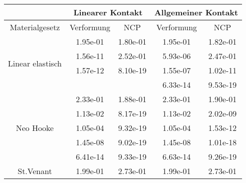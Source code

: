 \begin{table} 
\centering 
\begin{tabular}{c|cc|cc|} 
\cline{2-5} 
 & \multicolumn{2}{|c|}{Linearer Kontakt} & \multicolumn{2}{|c|}{Allgemeiner Kontakt} \\ 
\hline 
\multicolumn{1}{|c|}{Materialgesetz} & \multicolumn{1}{c|}{Verformung} & \multicolumn{1}{c|}{NCP} & \multicolumn{1}{c|}{Verformung} & \multicolumn{1}{c|}{NCP} \\ 
\hline 
\multicolumn{1}{|c|}{\multirow{4}{*}{Linear elastisch}} &\multicolumn{1}{|c|}{  1.95e-01} & \multicolumn{1}{|c|}{  1.80e-01} & \multicolumn{1}{|c|}{  1.95e-01} & \multicolumn{1}{|c|}{  1.82e-01} \\ 
\multicolumn{1}{|c|}{} & \multicolumn{1}{|c|}{  1.56e-11} & \multicolumn{1}{|c|}{  2.52e-01} & \multicolumn{1}{|c|}{  5.93e-06} & \multicolumn{1}{|c|}{  2.47e-01} \\ 
\multicolumn{1}{|c|}{} & \multicolumn{1}{|c|}{  1.57e-12} & \multicolumn{1}{|c|}{  8.10e-19} & \multicolumn{1}{|c|}{  1.55e-07} & \multicolumn{1}{|c|}{  1.02e-11} \\ 
\multicolumn{1}{|c|}{} & \multicolumn{1}{|c|}{} & \multicolumn{1}{|c|}{} & \multicolumn{1}{|c|}{  6.33e-14} & \multicolumn{1}{|c|}{  9.53e-19} \\ 
\hline 
\multicolumn{1}{|c|}{\multirow{5}{*}{Neo Hooke}} &\multicolumn{1}{|c|}{  2.33e-01} & \multicolumn{1}{|c|}{  1.88e-01} & \multicolumn{1}{|c|}{  2.33e-01} & \multicolumn{1}{|c|}{  1.90e-01} \\ 
\multicolumn{1}{|c|}{} & \multicolumn{1}{|c|}{  1.13e-02} & \multicolumn{1}{|c|}{  8.17e-19} & \multicolumn{1}{|c|}{  1.13e-02} & \multicolumn{1}{|c|}{  2.02e-09} \\ 
\multicolumn{1}{|c|}{} & \multicolumn{1}{|c|}{  1.05e-04} & \multicolumn{1}{|c|}{  9.32e-19} & \multicolumn{1}{|c|}{  1.05e-04} & \multicolumn{1}{|c|}{  1.53e-12} \\ 
\multicolumn{1}{|c|}{} & \multicolumn{1}{|c|}{  1.45e-08} & \multicolumn{1}{|c|}{  9.02e-19} & \multicolumn{1}{|c|}{  1.45e-08} & \multicolumn{1}{|c|}{  1.01e-18} \\ 
\multicolumn{1}{|c|}{} & \multicolumn{1}{|c|}{  6.41e-14} & \multicolumn{1}{|c|}{  9.33e-19} & \multicolumn{1}{|c|}{  6.63e-14} & \multicolumn{1}{|c|}{  9.26e-19} \\ 
\hline 
\multicolumn{1}{|c|}{\multirow{5}{*}{St.Venant}} &\multicolumn{1}{|c|}{  1.99e-01} & \multicolumn{1}{|c|}{  2.73e-01} & \multicolumn{1}{|c|}{  1.99e-01} & \multicolumn{1}{|c|}{  2.73e-01} \\ 

\end{tabular}
\end{table}
